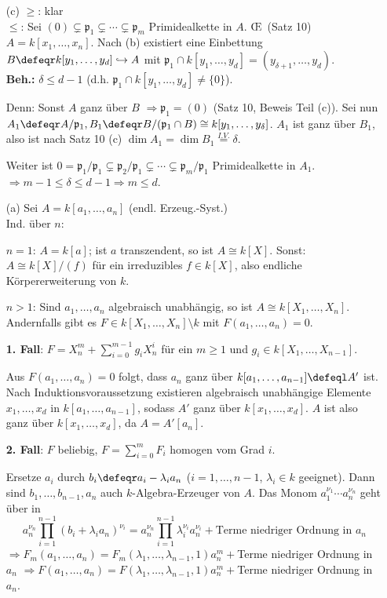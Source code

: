 \begin{Bew}
\begin{enumerate}
\item[(c)] \glqq$\geq$\grqq: klar\\
\glqq$\leq$\grqq: Sei $(0)\subsetneq \mathfrak{p}_1\subsetneq \cdots\subsetneq \mathfrak{p}_m$ Primidealkette
in $A$. \OE\ (Satz 10) $A=k[x_1,\ldots, x_n]$. Nach (b) existiert eine Einbettung 
$B\defeqr k[y_1,\ldots,y_d]\hookrightarrow A$ mit $\mathfrak{p}_1\cap k[y_1,\ldots, y_d]
=(y_{\delta+1},\ldots, y_d)$.\\
\textbf{Beh.:} $\delta\leq d-1$ (d.h. $\mathfrak{p}_1\cap k[y_1,\ldots,y_d]\neq \{0\}$).

Denn: Sonst $A$ ganz \"uber $B$ $\Rightarrow \mathfrak{p}_1=(0)$ (Satz 10, Beweis Teil (c)).
Sei nun $A_1\defeqr A/\mathfrak{p}_1, B_1\defeqr B/(\mathfrak{p}_1\cap B)
\cong k[y_1,\ldots, y_\delta]$. $A_1$ ist ganz \"uber $B_1$, also ist nach Satz 10 (c)
$\dim{A_1}=\dim{B_1} \stackrel{I.V.}{=}\delta$.

Weiter ist $0=\mathfrak{p}_1/\mathfrak{p}_1\subsetneq \mathfrak{p}_2/\mathfrak{p}_1
\subsetneq \cdots \subsetneq \mathfrak{p}_m/\mathfrak{p}_1$ Primidealkette in $A_1$.
$\Rightarrow m-1\leq \delta \leq d-1 \Rightarrow m\leq d$.

\item[(a)] Sei $A=k[a_1,\ldots, a_n]$  (endl. Erzeug.-Syst.)\\
Ind. \"uber $n$: 

$n=1$: $A=k[a]$; ist $a$ transzendent, so ist $A\cong k[X]$. Sonst: $A\cong k[X]/(f)$
f\"ur ein irreduzibles $f\in k[X]$, also endliche K\"orpererweiterung von $k$.

$n> 1$: Sind $a_1,\ldots, a_n$ algebraisch unabh\"angig, so ist $A\cong k[X_1,\ldots, X_n]$.
Andernfalls gibt es $F\in k[X_1, \ldots, X_n]\setminus k$ mit $F(a_1, \ldots,
a_n)=0$.

\textbf{1. Fall}: $F=X_n^m+\sum_{i=0}^{m-1}g_i X_n^i$ f\"ur ein $m\geq 1$ und
$g_i\in k[X_1,\ldots, X_{n-1}]$.

Aus $F(a_1, \ldots, a_n)=0$ folgt, dass $a_n$ ganz \"uber $k[a_1, \ldots,
a_{n-1}]\defeql A'$ ist.
Nach Induktionsvoraussetzung existieren algebraisch unabh\"angige Elemente 
$x_1,\ldots,x_d$ in
$k[a_1,\ldots, a_{n-1}]$, sodass $A'$ ganz \"uber $k[x_1,\ldots,x_d]$. $A$ ist also ganz
\"uber $k[x_1, \ldots, x_d]$, da $A=A'[a_n]$.

\textbf{2. Fall}: $F$ beliebig, $F=\sum_{i=0}^{m}F_i$ homogen vom Grad $i$. 

Ersetze $a_i$ durch $b_i\defeqr a_i-\lambda_i a_n$ ($i=1,\ldots, n-1$, $\lambda_i\in k$
\glqq geeignet\grqq). Dann sind $b_1,\ldots, b_{n-1},a_n$ auch $k$-Algebra-Erzeuger
von $A$. Das Monom $a_1^{\nu_1}\cdots a_n^{\nu_n}$ geht \"uber in 
\[
a_n^{\nu_n}\prod_{i=1}^{n-1}(b_i+\lambda_i a_n)^{\nu_i}
=a_n^{\nu_n}\prod_{i=1}^{n-1} \lambda_i^{\nu_i} a_n^{\nu_i}+
\text{Terme niedriger Ordnung in } a_n
\]
$\Rightarrow F_m(a_1,\ldots,
a_n)=F_m(\lambda_1,\ldots,\lambda_{n-1},1)a_n^m+$Terme niedriger Ordnung in 
$a_n$ $\Rightarrow F(a_1,\ldots,
a_n)=F(\lambda_1,\ldots,\lambda_{n-1},1)a_n^m+$Terme niedriger Ordnung in $a_n$.


\end{enumerate}
\end{Bew}
